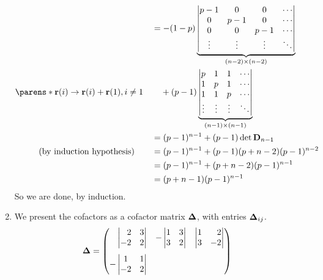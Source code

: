 \documentclass[fleqn,a4paper,11pt]{article}
\begin{document}
\begin{enumerate}[label=\textbf{\arabic*.}]
\begin{alignat*}
    && &= -(1 - p)\underbrace{\begin{vmatrix}
     p - 1 & 0 & 0 & \cdots \\
     0 & p - 1 & 0 & \cdots \\
     0 & 0 & p - 1 & \cdots \\
     \vdots & \vdots & \vdots & \ddots \\
    \end{vmatrix}}_{(n - 2) \times (n - 2)} \\
    \parens*{
     \vec r(i) \to \vec r(i) + \vec r(1), i \ne 1
    }
    && &\phantom{={}} + (p - 1)\underbrace{\begin{vmatrix}
     p & 1 & 1 & \cdots \\
     1 & p & 1 & \cdots \\
     1 & 1 & p & \cdots \\
     \vdots & \vdots & \vdots & \ddots
    \end{vmatrix}}_{(n - 1) \times (n - 1)} \\
    && &= (p - 1)^{n - 1} + (p - 1)\det  \mat D_{n - 1} \\
    (\text{by induction hypothesis})\quad
    && &= (p - 1)^{n - 1} + (p - 1) (p + n - 2)(p - 1)^{n - 2} \\
    && &= (p - 1)^{n - 1} + (p + n - 2)(p - 1)^{n - 1} \\
    && &= (p + n - 1)(p - 1)^{n - 1}
   \end{alignat*}
   So we are done, by induction.
  \item
   We present the cofactors as a cofactor matrix \(\mathbf{\Delta}\), with entries
   \(\mathbf{\Delta}_{ij}\).
   \begin{align*}
    \mat \Delta
    &= \begin{pmatrix*}[r]
     \begin{vmatrix*}[r]
      2 & 3 \\
      -2 & 2
     \end{vmatrix*} &
     -\begin{vmatrix}
      1 & 3 \\
      3 & 2
     \end{vmatrix} &
     \begin{vmatrix*}[r]
      1 & 2 \\
      3 & -2
     \end{vmatrix*} \\[3ex]
     -\begin{vmatrix}
      1 & 1 \\
      -2 & 2
     \end{vmatrix} &

\end{pmatrix*}
\end{align*}
\end{enumerate}
\end{document}
